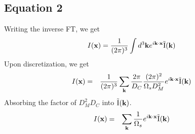 \documentclass[12pt]{article}
\def\il{{\tilde{\rm I}}}
\numberwithin{equation}{section}
\begin{document}
\subsection{Equation 2}
Writing the inverse FT, we get
\begin{eqnarray}
	I(\textbf{x}) = \frac{1}{(2\pi)^3}  \int d^3 \textbf{k} e^{i \textbf{k} \cdot \textbf{x}} \il(\textbf{k})
\end{eqnarray}
Upon discretization, we get
\begin{eqnarray}
	I(\textbf{x}) &=& \frac{1}{(2 \pi)^3} \sum_{\textbf{k}} \frac{2\pi}{D_C} \frac{(2\pi)^2}{\Omega_s D_M^2} e^{i \textbf{k} \cdot \textbf{x}} \il(\textbf{k}) 
\end{eqnarray}
Absorbing the factor of $ D_M^2 D_C $ into $ \il(\textbf{k}) $.
\begin{eqnarray}
	I(\textbf{x}) & = & \sum_\textbf{k} \frac{1}{\Omega_s} e^{i \textbf{k} \cdot \textbf{x}} \il(\textbf{k})
\end{eqnarray}
\end{document}
